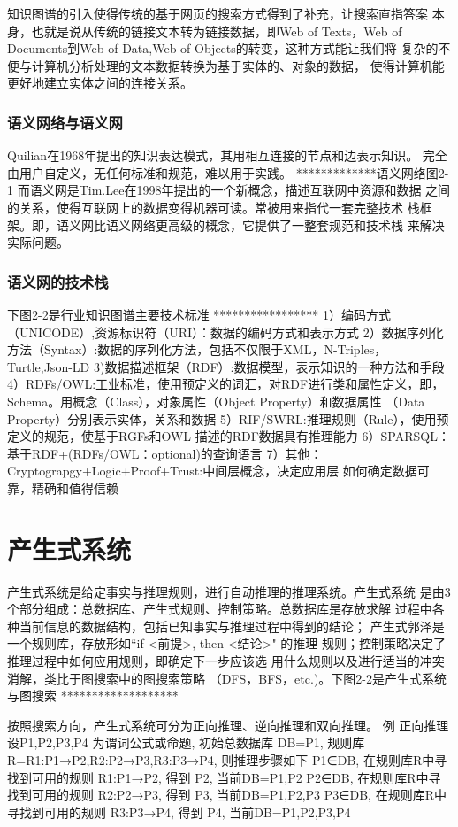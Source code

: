 \documentclass{standalone}
\begin{document}
知识图谱的引入使得传统的基于网页的搜索方式得到了补充，让搜索直指答案
本身，也就是说从传统的链接文本转为链接数据，即Web of Texts，Web of
Documents到Web of Data,Web of Objects的转变，这种方式能让我们将
复杂的不便与计算机分析处理的文本数据转换为基于实体的、对象的数据，
使得计算机能更好地建立实体之间的连接关系。
\subsubsection{语义网络与语义网}
Quilian在1968年提出的知识表达模式，其用相互连接的节点和边表示知识。
完全由用户自定义，无任何标准和规范，难以用于实践。
*************语义网络图2-1
而语义网是Tim.Lee在1998年提出的一个新概念，描述互联网中资源和数据
之间的关系，使得互联网上的数据变得机器可读。常被用来指代一套完整技术
栈框架。即，语义网比语义网络更高级的概念，它提供了一整套规范和技术栈
来解决实际问题。
\subsubsection{语义网的技术栈}
下图2-2是行业知识图谱主要技术标准
*****************
1）编码方式（UNICODE）,资源标识符（URI）：数据的编码方式和表示方式
2）数据序列化方法（Syntax）:数据的序列化方法，包括不仅限于XML，N-Triples，
Turtle,Json-LD 
3)数据描述框架（RDF）:数据模型，表示知识的一种方法和手段
4）RDFs/OWL:工业标准，使用预定义的词汇，对RDF进行类和属性定义，即，
Schema。用概念（Class），对象属性（Object Property）和数据属性
（Data Property）分别表示实体，关系和数据
5）RIF/SWRL:推理规则（Rule），使用预定义的规范，使基于RGFs和OWL
描述的RDF数据具有推理能力
6）SPARSQL：基于RDF+(RDFs/OWL：optional)的查询语言
7）其他：Cryptograpgy+Logic+Proof+Trust:中间层概念，决定应用层
如何确定数据可靠，精确和值得信赖
\section{产生式系统}
产生式系统是给定事实与推理规则，进行自动推理的推理系统。产生式系统
是由3个部分组成：总数据库、产生式规则、控制策略。总数据库是存放求解
过程中各种当前信息的数据结构，包括已知事实与推理过程中得到的结论；
产生式郭泽是一个规则库，存放形如“if <前提>, then <结论>" 的推理
规则；控制策略决定了推理过程中如何应用规则，即确定下一步应该选
用什么规则以及进行适当的冲突消解，类比于图搜索中的图搜索策略
（DFS，BFS，etc.)。下图2-2是产生式系统与图搜索
*******************

按照搜索方向，产生式系统可分为正向推理、逆向推理和双向推理。
例 正向推理 设P1,P2,P3,P4 为谓词公式或命题, 初始总数据库 DB={P1},
 规则库 R={R1:P1→P2,R2:P2→P3,R3:P3→P4}, 则推理步骤如下
P1∈DB, 在规则库R中寻找到可用的规则 R1:P1→P2, 得到 P2, 当前DB={P1,P2}
P2∈DB, 在规则库R中寻找到可用的规则 R2:P2→P3, 得到 P3, 当前DB={P1,P2,P3}
P3∈DB, 在规则库R中寻找到可用的规则 R3:P3→P4, 得到 P4, 当前DB={P1,P2,P3,P4}
\end{document}
